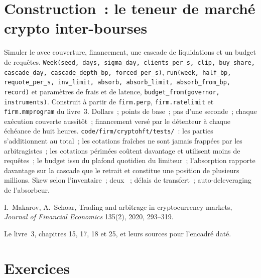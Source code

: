 \section{Construction~: le teneur de marché crypto inter-bourses}\label{bld:hf:crypto-high-frequency-trading-on-centralised-venues:cryptohft}

\begin{build}
 Simuler le  avec couverture, financement, une cascade de liquidations et un budget de requêtes.
 \texttt{Week(seed, days, sigma\_day, clients\_per\_s, clip, buy\_share, cascade\_day, cascade\_depth\_bp, forced\_per\_s)},
\texttt{run(week, half\_bp, requote\_per\_s, inv\_limit, absorb, absorb\_limit, absorb\_from\_bp, record)} et paramètres de frais et de latence,
\texttt{budget\_from(governor, instruments)}. Construit à partir de \texttt{firm.perp}, \texttt{firm.ratelimit} et \texttt{firm.mmprogram} du livre~3.
 Dollars~; points de base~; pas d'une seconde~; chaque exécution couverte aussitôt~; financement versé par le détenteur à chaque échéance de huit heures.
 \texttt{code/firm/cryptohft/tests/}~: les parties s'additionnent au total~; les cotations fraîches ne sont jamais frappées par les arbitragistes~; les cotations périmées coûtent
davantage et utilisent moins de requêtes~; le budget issu du plafond quotidien du limiteur~; l'absorption rapporte davantage sur la cascade que le retrait et constitue une
position de plusieurs millions.
 Skew selon l'inventaire~; deux ~; délais de transfert~; auto-deleveraging de l'absorbeur.
\end{build}

\begin{omsources}
\item I.~Makarov, A.~Schoar, Trading and arbitrage in cryptocurrency markets, \emph{Journal of Financial Economics} 135(2), 2020, 293--319.
\item Le livre~3, chapitres 15, 17, 18 et 25, et leurs sources pour l'encadré daté.
\end{omsources}

\section{Exercices}

